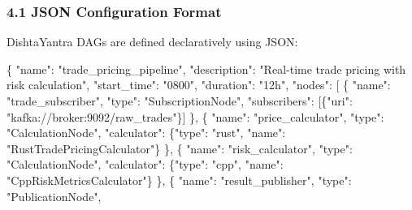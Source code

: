 \documentclass[
]{article}
\newenvironment{Shaded}{}{}
\newcommand{\DataTypeTok}[1]{\textcolor[rgb]{0.56,0.13,0.00}{#1}}
\newcommand{\FunctionTok}[1]{\textcolor[rgb]{0.02,0.16,0.49}{#1}}
\newcommand{\OtherTok}[1]{\textcolor[rgb]{0.00,0.44,0.13}{#1}}
\newcommand{\StringTok}[1]{\textcolor[rgb]{0.25,0.44,0.63}{#1}}
\begin{document}
\hypertarget{json-configuration-format}{%
\subsubsection{4.1 JSON Configuration
Format}\label{json-configuration-format}}

DishtaYantra DAGs are defined declaratively using JSON:

\begin{Shaded}
\begin{Highlighting}[]
\FunctionTok{\{}
    \DataTypeTok{"name"}\FunctionTok{:} \StringTok{"trade\_pricing\_pipeline"}\FunctionTok{,}
    \DataTypeTok{"description"}\FunctionTok{:} \StringTok{"Real{-}time trade pricing with risk calculation"}\FunctionTok{,}
    \DataTypeTok{"start\_time"}\FunctionTok{:} \StringTok{"0800"}\FunctionTok{,}
    \DataTypeTok{"duration"}\FunctionTok{:} \StringTok{"12h"}\FunctionTok{,}
    \DataTypeTok{"nodes"}\FunctionTok{:} \OtherTok{[}
        \FunctionTok{\{}
            \DataTypeTok{"name"}\FunctionTok{:} \StringTok{"trade\_subscriber"}\FunctionTok{,}
            \DataTypeTok{"type"}\FunctionTok{:} \StringTok{"SubscriptionNode"}\FunctionTok{,}
            \DataTypeTok{"subscribers"}\FunctionTok{:} \OtherTok{[}\FunctionTok{\{}\DataTypeTok{"uri"}\FunctionTok{:} \StringTok{"kafka://broker:9092/raw\_trades"}\FunctionTok{\}}\OtherTok{]}
        \FunctionTok{\}}\OtherTok{,}
        \FunctionTok{\{}
            \DataTypeTok{"name"}\FunctionTok{:} \StringTok{"price\_calculator"}\FunctionTok{,}
            \DataTypeTok{"type"}\FunctionTok{:} \StringTok{"CalculationNode"}\FunctionTok{,}
            \DataTypeTok{"calculator"}\FunctionTok{:} \FunctionTok{\{}\DataTypeTok{"type"}\FunctionTok{:} \StringTok{"rust"}\FunctionTok{,} \DataTypeTok{"name"}\FunctionTok{:} \StringTok{"RustTradePricingCalculator"}\FunctionTok{\}}
        \FunctionTok{\}}\OtherTok{,}
        \FunctionTok{\{}
            \DataTypeTok{"name"}\FunctionTok{:} \StringTok{"risk\_calculator"}\FunctionTok{,}
            \DataTypeTok{"type"}\FunctionTok{:} \StringTok{"CalculationNode"}\FunctionTok{,}
            \DataTypeTok{"calculator"}\FunctionTok{:} \FunctionTok{\{}\DataTypeTok{"type"}\FunctionTok{:} \StringTok{"cpp"}\FunctionTok{,} \DataTypeTok{"name"}\FunctionTok{:} \StringTok{"CppRiskMetricsCalculator"}\FunctionTok{\}}
        \FunctionTok{\}}\OtherTok{,}
        \FunctionTok{\{}
            \DataTypeTok{"name"}\FunctionTok{:} \StringTok{"result\_publisher"}\FunctionTok{,}
            \DataTypeTok{"type"}\FunctionTok{:} \StringTok{"PublicationNode"}\FunctionTok{,}

\end{Highlighting}
\end{Shaded}
\end{document}
